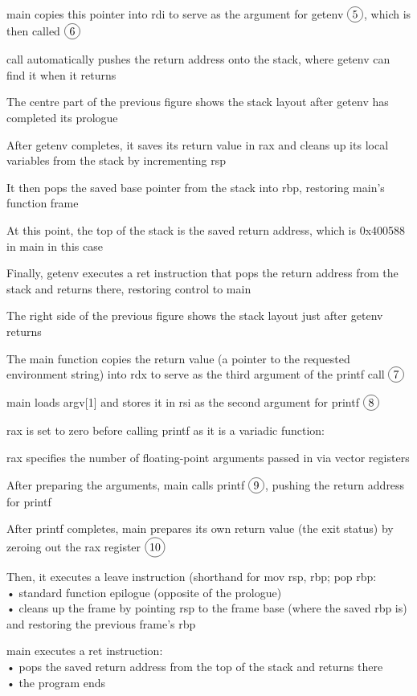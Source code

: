 \documentclass[]{project_plan}
\newcommand*\circled[1]{\tikz[baseline=(char.base)]{
            \node[shape=circle,draw,inner sep=2pt] (char) {#1};}}
\begin{document}
main copies this pointer into rdi to serve as the argument for getenv $\circled{5}$, which is then called $\circled{6}$

call automatically pushes the return address onto the stack, where getenv can find it when it
returns

The centre part of the previous figure shows the stack layout after getenv has completed
its prologue

After getenv completes, it saves its return value in rax and cleans up its local variables
from the stack by incrementing rsp

It then pops the saved base pointer from the stack into rbp, restoring main’s function frame

At this point, the top of the stack is the saved return address, which is 0x400588 in main
in this case

Finally, getenv executes a ret instruction that pops the return address from the stack and returns
there, restoring control to main

The right side of the previous figure shows the stack layout just after getenv returns

The main function copies the return value (a pointer to the requested environment string) into
rdx to serve as the third argument of the printf call $\circled{7}$

main loads argv[1] and stores it in rsi as the second argument for printf $\circled{8}$

rax is set to zero before calling printf as it is a variadic function:

rax specifies the number of floating-point arguments passed in via vector registers

After preparing the arguments, main calls printf $\circled{9}$, pushing the return address for printf

After printf completes, main prepares its own return value (the exit status) by zeroing out
the rax register $\circled{10}$

Then, it executes a leave instruction (shorthand for mov rsp, rbp; pop rbp:\\
• standard function epilogue (opposite of the prologue)\\
• cleans up the frame by pointing rsp to the frame base (where the saved rbp is) and restoring the previous
frame's rbp

main executes a ret instruction:\\
• pops the saved return address from the top of the stack and returns there\\
• the program ends
\end{document}
